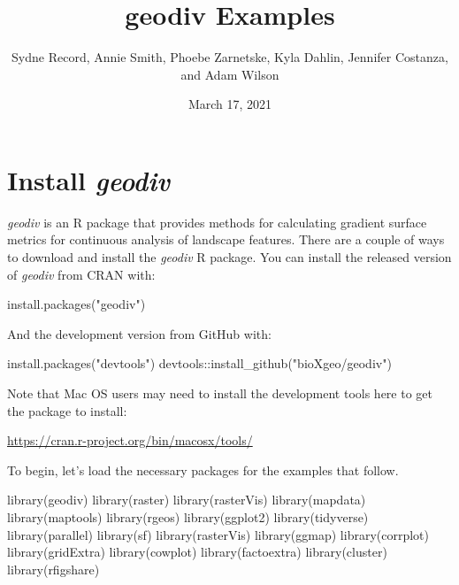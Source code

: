 \documentclass[
]{article}
\title{geodiv Examples}
\author{Sydne Record, Annie Smith, Phoebe Zarnetske, Kyla Dahlin,
Jennifer Costanza, and Adam Wilson}
\date{March 17, 2021}
\newenvironment{Shaded}{\begin{snugshade}}{\end{snugshade}}
\newcommand{\FunctionTok}[1]{\textcolor[rgb]{0.00,0.00,0.00}{#1}}
\newcommand{\NormalTok}[1]{#1}
\newcommand{\SpecialCharTok}[1]{\textcolor[rgb]{0.00,0.00,0.00}{#1}}
\newcommand{\StringTok}[1]{\textcolor[rgb]{0.31,0.60,0.02}{#1}}
\begin{document}
\maketitle

\newpage 
\tableofcontents 
\newpage

\hypertarget{install-geodiv}{%
\section{\texorpdfstring{Install
\emph{geodiv}}{Install geodiv}}\label{install-geodiv}}

\emph{geodiv} is an R package that provides methods for calculating
gradient surface metrics for continuous analysis of landscape features.
There are a couple of ways to download and install the \emph{geodiv} R
package. You can install the released version of \emph{geodiv} from CRAN
with:

\begin{Shaded}
\begin{Highlighting}[]
\FunctionTok{install.packages}\NormalTok{(}\StringTok{"geodiv"}\NormalTok{)}
\end{Highlighting}
\end{Shaded}

And the development version from GitHub with:

\begin{Shaded}
\begin{Highlighting}[]
\FunctionTok{install.packages}\NormalTok{(}\StringTok{"devtools"}\NormalTok{)}
\NormalTok{devtools}\SpecialCharTok{::}\FunctionTok{install\_github}\NormalTok{(}\StringTok{"bioXgeo/geodiv"}\NormalTok{)}
\end{Highlighting}
\end{Shaded}

Note that Mac OS users may need to install the development tools here to
get the package to install:

\url{https://cran.r-project.org/bin/macosx/tools/}

To begin, let's load the necessary packages for the examples that
follow.

\begin{Shaded}
\begin{Highlighting}[]
\FunctionTok{library}\NormalTok{(geodiv)}
\FunctionTok{library}\NormalTok{(raster)}
\FunctionTok{library}\NormalTok{(rasterVis)}
\FunctionTok{library}\NormalTok{(mapdata)}
\FunctionTok{library}\NormalTok{(maptools)}
\FunctionTok{library}\NormalTok{(rgeos)}
\FunctionTok{library}\NormalTok{(ggplot2)}
\FunctionTok{library}\NormalTok{(tidyverse)}
\FunctionTok{library}\NormalTok{(parallel)}
\FunctionTok{library}\NormalTok{(sf)}
\FunctionTok{library}\NormalTok{(rasterVis)}
\FunctionTok{library}\NormalTok{(ggmap)}
\FunctionTok{library}\NormalTok{(corrplot)}
\FunctionTok{library}\NormalTok{(gridExtra)}
\FunctionTok{library}\NormalTok{(cowplot)}
\FunctionTok{library}\NormalTok{(factoextra)}
\FunctionTok{library}\NormalTok{(cluster)}
\FunctionTok{library}\NormalTok{(rfigshare)}
\end{Highlighting}
\end{Shaded}
\end{document}

